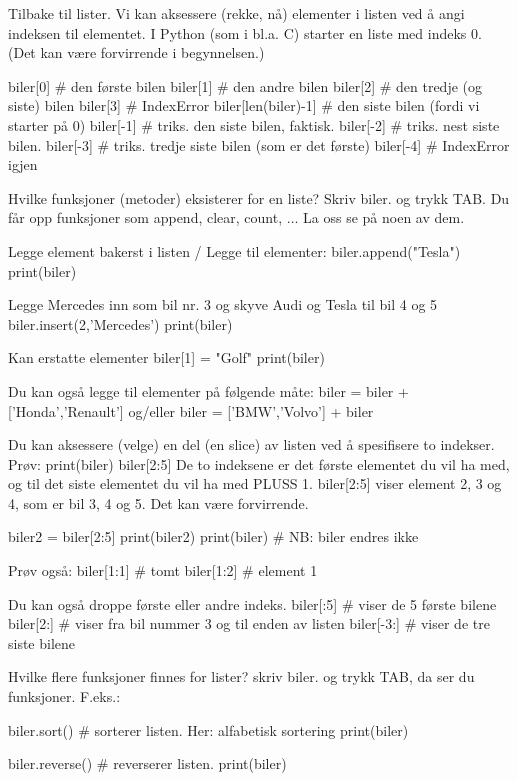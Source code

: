 \documentclass[a4paper,11pt,utf8]{book}
\begin{document}
Tilbake til lister. 
Vi kan aksessere (rekke, nå) elementer i listen ved å angi indeksen til elementet. 
I Python (som i bl.a. C) starter en liste med indeks 0.
(Det kan være forvirrende i begynnelsen.) 

biler[0]       # den første bilen 
biler[1]       # den andre bilen
biler[2]       # den tredje (og siste) bilen
biler[3]       # IndexError
biler[len(biler)-1]   # den siste bilen (fordi vi starter på 0) 
biler[-1]      # triks. den siste bilen, faktisk. 
biler[-2]      # triks. nest siste bilen. 
biler[-3]      # triks. tredje siste bilen (som er det første)
biler[-4]      # IndexError igjen


Hvilke funksjoner (metoder) eksisterer for en liste?
Skriv biler. og trykk TAB. 
Du får opp funksjoner som append, clear, count, ... 
La oss se på noen av dem. 


Legge element bakerst i listen / Legge til elementer: 
biler.append("Tesla")
print(biler)

Legge Mercedes inn som bil nr. 3 og skyve Audi og Tesla til bil 4 og 5 
biler.insert(2,'Mercedes')
print(biler)

Kan erstatte elementer
biler[1] = "Golf"
print(biler)

Du kan også legge til elementer på følgende måte:
biler = biler + ['Honda','Renault']
og/eller 
biler = ['BMW','Volvo'] + biler


Du kan aksessere (velge) en del (en slice) av listen ved å spesifisere to indekser.
Prøv: 
print(biler)
biler[2:5]
De to indeksene er det første elementet du vil ha med,
og til det siste elementet du vil ha med PLUSS 1. 
biler[2:5] viser element 2, 3 og 4, som er bil 3, 4 og 5. 
Det kan være forvirrende. 

biler2 = biler[2:5] 
print(biler2)
print(biler)          # NB: biler endres ikke 

Prøv også: 
biler[1:1]   # tomt
biler[1:2]   # element 1


Du kan også droppe første eller andre indeks.
biler[:5]     # viser de 5 første bilene
biler[2:]     # viser fra bil nummer 3 og til enden av listen
biler[-3:]    # viser de tre siste bilene


Hvilke flere funksjoner finnes for lister?
skriv biler. og trykk TAB, da ser du funksjoner. 
F.eks.:

biler.sort()          # sorterer listen. Her: alfabetisk sortering
print(biler)

biler.reverse()       # reverserer listen. 
print(biler)
\end{document}
